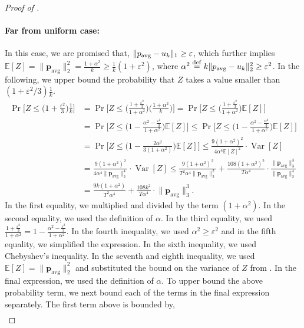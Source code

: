 \documentclass[10pt]{article} %
\def\eps{{\varepsilon}}
\newcommand{\E}{\mathbb{E}}
\theoremstyle{plain}
\newcommand{\bp}{\textbf{p}}
\newcommand{\avg}{\mathrm{avg}}
\newcommand{\Var}{\operatorname{{Var}}}
\newcommand{\defeq}{\stackrel{\mathrm{def}}{=}}
\begin{document}
\begin{proof}[Proof of ]
	\paragraph{Far from uniform case:} In this case, we are promised that, $\| \bp_{\avg}-\uni_k\|_1 \geq \eps$, which further implies  $\E[Z] = \|\bp_{\avg}\|_2^2 = \frac{1+\alpha^2}{k} \ge \frac{1}{k}(1+\eps^2)$, where $\alpha^2 \defeq  k\|\bp_{\avg}-\uni_k\|_2^2 \ge \eps^2$. In the following, we upper bound the probability that $Z$ takes a value smaller than  $(1+\eps^2/3)\frac{1}{k}$. 
	\begin{align}\label{eq:thm1f1}
		\Pr\Big[ Z \le \Big(1+\frac{\eps^2}{3}\Big)\frac{1}{k}\Big] &= \Pr\Big[ Z \le \Big(\frac{1+\frac{\eps^2}{3}}{1+\alpha^2}\Big)\Big(\frac{1+\alpha^2}{k}\Big)\Big]
		= \Pr\Big[ Z \le \Big(\frac{1+\frac{\eps^2}{3}}{1+\alpha^2}\Big)\E[Z]\Big] \nonumber\\
		&= \Pr\Big[ Z \le \Big(1-\frac{\alpha^2-\frac{\eps^2}{3}}{1+\alpha^2}\Big)\E[Z]\Big]
		\le \Pr\Big[ Z \le \Big(1-\frac{\alpha^2-\frac{\alpha^2}{3}}{1+\alpha^2}\Big)\E[Z]\Big] \nonumber\\
		&= \Pr\Big[ Z \le \Big(1-\frac{2\alpha^2}{3(1+\alpha^2)}\Big)\E[Z]\Big]
		\le \frac{9(1+\alpha^2)^2}{4\alpha^4\E[Z]^2}\cdot\Var[Z] \nonumber \\
		&= \frac{9(1+\alpha^2)^2}{4\alpha^4\|\bp_{\avg}\|_2^4}\cdot\Var[Z] 
		\le \frac{9(1+\alpha^2)^2}{T^2\alpha^4\|\bp_{\avg}\|_2^2} + \frac{108(1+\alpha^2)^2}{T\alpha^4}\cdot \frac{\Big\| \bp_{\avg}\Big\|^3_3}{\|\bp_{\avg}\|^4_2} \nonumber\\
		&= \frac{9k(1+\alpha^2)}{T^2\alpha^4} + \frac{108k^2}{T\alpha^4}\cdot \Big\| \bp_{\avg}\Big\|^3_3.
	\end{align}
	In the first equality, we multiplied and divided by the term $(1+\alpha^2)$.  In the second equality, we used the definition of $\alpha$. In the third equality, we used $\frac{1+\frac{\eps^2}{3}}{1+\alpha^2}=1-\frac{\alpha^2-\frac{\eps^2}{3}}{1+\alpha^2}$. In the fourth inequality, we used $\alpha^2 \geq \eps^2$ and in the fifth equality, we simplified the expression. In the sixth inequality, we used Chebyshev's inequality. In the seventh and eighth inequality, we used $\E[Z]=\|\bp_{\avg}\|_2^2$ and substituted the bound on the variance of $Z$ from . In the final expression, we used the definition of $\alpha$. To upper bound the above probability term, we next bound each of the terms in the final expression separately. The first term above is bounded by,
	\begin{align}\label{eq:thm1f2}

\end{align}
\end{proof}
\end{document}
